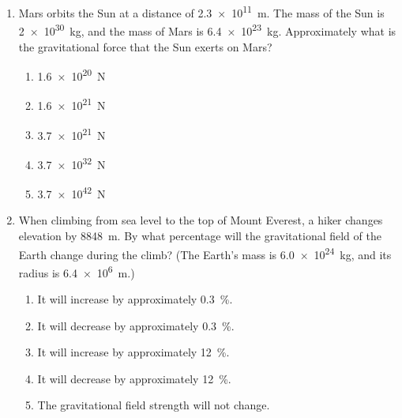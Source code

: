 \documentclass{../../oss-apphys}
\begin{document}
\begin{multicols}{2}
\begin{enumerate}[leftmargin=18pt,start=8]
  \item Mars orbits the Sun at a distance of \SI{2.3e11}{m}. The mass of the Sun
    is \SI{2e30}{kg}, and the mass of Mars is \SI{6.4e23}{kg}. Approximately
    what is the gravitational force that the Sun exerts on Mars?
    \begin{enumerate}[noitemsep,topsep=0pt,leftmargin=18pt]
    \item\SI{1.6e20}{N}
    \item\SI{1.6e21}{N}
    \item\SI{3.7e21}{N}
    \item\SI{3.7e32}{N}
    \item\SI{3.7e42}{N}
    \end{enumerate}

  \item When climbing from sea level to the top of Mount Everest, a hiker
    changes elevation by \SI{8848}{m}. By what percentage will the
    gravitational field of the Earth change during the climb? (The Earth's
    mass is \SI{6.0e24}{\kg}, and its radius is \SI{6.4e6}{\m}.)
    \begin{enumerate}[noitemsep,topsep=0pt,leftmargin=18pt]
    \item It will increase by approximately \SI{0.3}{\percent}.
    \item It will decrease by approximately \SI{0.3}{\percent}.
    \item It will increase by approximately \SI{12}{\percent}.
    \item It will decrease by approximately \SI{12}{\percent}.
    \item The gravitational field strength will not change.
    \end{enumerate}


\end{enumerate}
\end{multicols}
\end{document}
